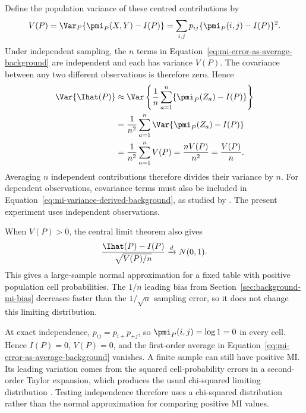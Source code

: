 Define the population variance of these centred contributions by
\begin{equation}
  V(P)
  =\Var_P\{\pmi_P(X,Y)-I(P)\}
  =\sum_{i,j}p_{ij}\{\pmi_P(i,j)-I(P)\}^2.
  \label{eq:mi-variance-background}
\end{equation}
Under independent sampling, the \(n\) terms in
Equation~\eqref{eq:mi-error-as-average-background} are independent and each
has variance \(V(P)\). The covariance between any two different observations
is therefore zero. Hence
\begin{align}
  \Var\{\Ihat(P)\}
  &\approx
  \Var\left\{
    \frac{1}{n}\sum_{a=1}^{n}
    \{\pmi_P(Z_a)-I(P)\}
  \right\}
  \notag\\
  &=\frac{1}{n^2}
    \sum_{a=1}^{n}\Var\{\pmi_P(Z_a)-I(P)\}
  \notag\\
  &=\frac{1}{n^2}\sum_{a=1}^{n}V(P)
  =\frac{nV(P)}{n^2}
  =\frac{V(P)}{n}.
  \label{eq:mi-variance-derived-background}
\end{align}
Averaging \(n\) independent contributions therefore divides their variance
by \(n\). For dependent observations, covariance terms must also be included
in Equation~\eqref{eq:mi-variance-derived-background}, as studied by
\citet{moddemeijer1999}. The present experiment uses independent observations.

When \(V(P)>0\), the central limit theorem also gives
\begin{equation}
  \frac{\Ihat(P)-I(P)}{\sqrt{V(P)/n}}
  \xrightarrow{d}N(0,1).
  \label{eq:mi-clt-background}
\end{equation}
This gives a large-sample normal approximation for a fixed table with
positive population cell probabilities. The \(1/n\) leading bias from
Section~\ref{sec:background-mi-bias} decreases faster than the
\(1/\sqrt n\) sampling error, so it does not change this limiting
distribution.

\medskip
{}
\nopagebreak[4]

At exact independence, \(p_{ij}=p_{i+}p_{+j}\), so
\(\pmi_P(i,j)=\log 1=0\) in every cell. Hence \(I(P)=0\), \(V(P)=0\), and the
first-order average in Equation~\eqref{eq:mi-error-as-average-background}
vanishes.
A finite sample can still have positive MI. Its leading variation comes from
the squared cell-probability errors in a second-order Taylor expansion, which
produces the usual chi-squared limiting distribution
\citep{brillinger2004,marinescu2025}. Testing independence therefore uses a
chi-squared distribution rather than the normal approximation for comparing
positive MI values.


